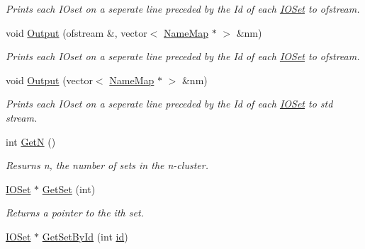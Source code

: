 \begin{DoxyCompactItemize}
\begin{DoxyCompactList}\small\item\em Prints each IOset on a seperate line preceded by the Id of each \hyperlink{class_i_o_set}{IOSet} to ofstream. \item\end{DoxyCompactList}\item 
void \hyperlink{class_n_cluster_a5f75034c596cda89b823bb842f54019e}{Output} (ofstream \&, vector$<$ \hyperlink{class_name_map}{NameMap} $\ast$ $>$ \&nm)
\begin{DoxyCompactList}\small\item\em Prints each IOset on a seperate line preceded by the Id of each \hyperlink{class_i_o_set}{IOSet} to ofstream. \item\end{DoxyCompactList}\item 
void \hyperlink{class_n_cluster_a762a3beaf5aa389d8afccabe227d30e3}{Output} (vector$<$ \hyperlink{class_name_map}{NameMap} $\ast$ $>$ \&nm)
\begin{DoxyCompactList}\small\item\em Prints each IOset on a seperate line preceded by the Id of each \hyperlink{class_i_o_set}{IOSet} to std stream. \item\end{DoxyCompactList}\item 
\hypertarget{class_n_cluster_a5e91f8c38a0122031c3f921b94e3a688}{
int \hyperlink{class_n_cluster_a5e91f8c38a0122031c3f921b94e3a688}{GetN} ()}
\label{class_n_cluster_a5e91f8c38a0122031c3f921b94e3a688}

\begin{DoxyCompactList}\small\item\em Resurns n, the number of sets in the n-\/cluster. \item\end{DoxyCompactList}\item 
\hypertarget{class_n_cluster_a7d197e1cf217fe1ce95b0ba0b4ee40bc}{
\hyperlink{class_i_o_set}{IOSet} $\ast$ \hyperlink{class_n_cluster_a7d197e1cf217fe1ce95b0ba0b4ee40bc}{GetSet} (int)}
\label{class_n_cluster_a7d197e1cf217fe1ce95b0ba0b4ee40bc}

\begin{DoxyCompactList}\small\item\em Returns a pointer to the ith set. \item\end{DoxyCompactList}\item 
\hypertarget{class_n_cluster_a5d4ddbb124fc5d9c9cc706312ec80476}{
\hyperlink{class_i_o_set}{IOSet} $\ast$ \hyperlink{class_n_cluster_a5d4ddbb124fc5d9c9cc706312ec80476}{GetSetById} (int \hyperlink{class_n_cluster_a9360cadd4e338b91de61f86997acc890}{id})}
\label{class_n_cluster_a5d4ddbb124fc5d9c9cc706312ec80476}


\end{DoxyCompactItemize}
